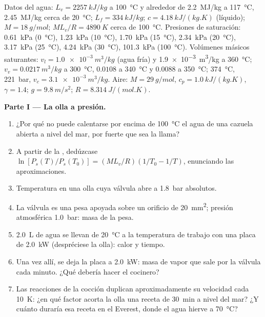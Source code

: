 \begin{problem}
\label{pb:b1:phase-changes:1}
Datos del agua: $L_v = \qty{2257}{kJ/kg}$ a \qty{100}{\degreeCelsius} y
alrededor de \qty{2.2}{MJ/kg} a \qty{117}{\degreeCelsius}, \qty{2.45}{MJ/kg} cerca de
\qty{20}{\degreeCelsius}; $L_f = \qty{334}{kJ/kg}$; $c = \qty{4.18}{kJ/(kg.K)}$
(líquido); $M = \qty{18}{g/mol}$; $ML_v/R = \qty{4890}{K}$ cerca de
\qty{100}{\degreeCelsius}. Presiones de saturación: \qty{0.61}{kPa}
(\qty{0}{\degreeCelsius}), \qty{1.23}{kPa} (\qty{10}{\degreeCelsius}), \qty{1.70}{kPa} (\qty{15}{\degreeCelsius}),
\qty{2.34}{kPa} (\qty{20}{\degreeCelsius}), \qty{3.17}{kPa} (\qty{25}{\degreeCelsius}), \qty{4.24}{kPa}
(\qty{30}{\degreeCelsius}), \qty{101.3}{kPa} (\qty{100}{\degreeCelsius}).
Volúmenes másicos saturantes: $v_l = \qty{1.0e-3}{m^3/kg}$ (agua fría) y
\qty{1.9e-3}{m^3/kg} a \qty{360}{\degreeCelsius}; $v_v = \qty{0.0217}{m^3/kg}$
a \qty{300}{\degreeCelsius}, $0.0108$ a \qty{340}{\degreeCelsius} y $0.0088$
a \qty{350}{\degreeCelsius};  \qty{374}{\degreeCelsius},
\qty{221}{bar}, $v_c = \qty{3.1e-3}{m^3/kg}$. Aire: $M = \qty{29}{g/mol}$, $c_p =
\qty{1.0}{kJ/(kg.K)}$, $\gamma = 1.4$; $g = \qty{9.8}{m/s^2}$; $R =
\qty{8.314}{J/(mol.K)}$.

\medskip
\noindent\textbf{Parte I --- La olla a presión.}
\begin{enumerate}
  \item ¿Por qué no puede calentarse por encima de \qty{100}{\degreeCelsius}
        el agua de una cazuela abierta a nivel del mar, por fuerte que sea
        la llama?
  \item A partir de la , dedúzcase
        $\ln[P_s(T)/P_s(T_0)] = (ML_v/R)(1/T_0 - 1/T)$, enunciando las
        aproximaciones.
  \item Temperatura en una olla cuya válvula abre a \qty{1.8}{bar}
        absolutos.
  \item La válvula es una pesa apoyada sobre un orificio de \qty{20}{mm^2};
        presión atmosférica \qty{1.0}{bar}: masa de la pesa.
  \item \qty{2.0}{L} de agua se llevan de \qty{20}{\degreeCelsius} a la
        temperatura de trabajo con una placa de \qty{2.0}{kW}
        (despréciese la olla): calor y tiempo.
  \item Una vez allí, se deja la placa a \qty{2.0}{kW}: masa de vapor que
        sale por la válvula cada minuto. ¿Qué debería hacer el cocinero?
  \item Las reacciones de la cocción duplican aproximadamente su velocidad
        cada \qty{10}{K}: ¿en qué factor acorta la olla una receta de
        \qty{30}{min} a nivel del mar? ¿Y cuánto duraría esa receta en el
        Everest, donde el agua hierve a \qty{70}{\degreeCelsius}?
\end{enumerate}


\end{problem}
